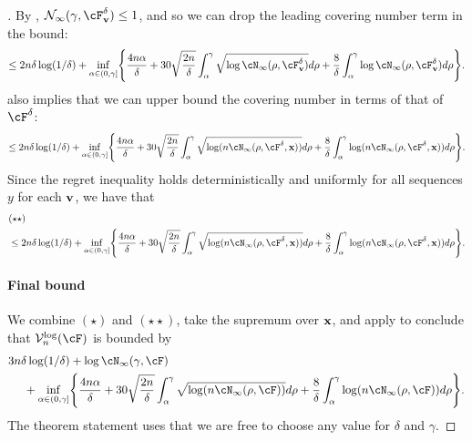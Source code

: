 \begin{proof}[]
  By , $\mathcal{N}_{\infty}(\gamma, \cF_{\vv}^{\delta} ) \leq{} 1$, and so we can drop the leading covering number term in the bound:
  {\small
  \[
    \leq{}
    2n\delta\log(1/\delta)
    + \inf_{\alpha\in(0, \gamma]}\crl*{
      \frac{4n\alpha}{\delta} + 30\sqrt{\frac{2n}{\delta}}\int_{\alpha}^{\gamma}\sqrt{\log\cN_{\infty}(\rho,\cF_{\vv}^{\delta})}d\rho
      + \frac{8}{\delta}\int_{\alpha}^{\gamma}\log\cN_{\infty}(\rho,\cF_{\vv}^{\delta})d\rho
    }.
  \]}
   also implies that we can upper bound the covering number in terms of that of $\cF^{\delta}$:
    {\small\[
    \leq{}
    2n\delta\log(1/\delta)
    + \inf_{\alpha\in(0, \gamma]}\crl*{
      \frac{4n\alpha}{\delta} + 30\sqrt{\frac{2n}{\delta}}\int_{\alpha}^{\gamma}\sqrt{\log(n\cN_{\infty}(\rho,\cF^{\delta}, \x))}d\rho
      + \frac{8}{\delta}\int_{\alpha}^{\gamma}\log(n\cN_{\infty}(\rho,\cF^{\delta}, \x))d\rho
    }.
  \]}
  Since the regret inequality holds deterministically and uniformly for all sequences $y$ for each $\mathbf{v}$, we have that
{\small\begin{align*}
   &(\star\star) \\&    \leq{}
    2n\delta\log(1/\delta)
    + \inf_{\alpha\in(0, \gamma]}\crl*{
      \frac{4n\alpha}{\delta} + 30\sqrt{\frac{2n}{\delta}}\int_{\alpha}^{\gamma}\sqrt{\log(n\cN_{\infty}(\rho,\cF^{\delta}, \x))}d\rho
      + \frac{8}{\delta}\int_{\alpha}^{\gamma}\log(n\cN_{\infty}(\rho,\cF^{\delta}, \x))d\rho
    }.
 \end{align*}}

  \paragraph{Final bound}
We combine $(\star)$ and $(\star\star)$, take the supremum over $\mathbf{x}$, and apply  to conclude that $\mathcal{V}^{\mathrm{log}}_n(\F)$ is bounded by
{\small
\begin{align*}
  &3n\delta\log(1/\delta)
  + \log\cN_{\infty}(\gamma, \cF)\\
    &~~~~+ \inf_{\alpha\in(0, \gamma]}\crl*{
      \frac{4n\alpha}{\delta}
       + 30\sqrt{\frac{2n}{\delta}}\int_{\alpha}^{\gamma}\sqrt{\log(n\cN_{\infty}(\rho,\cF))}d\rho
      + \frac{8}{\delta}\int_{\alpha}^{\gamma}\log(n\cN_{\infty}(\rho,\F))d\rho
    }.
\end{align*}}
The theorem statement uses that we are free to choose any value for $\delta$ and $\gamma$.
\end{proof}

